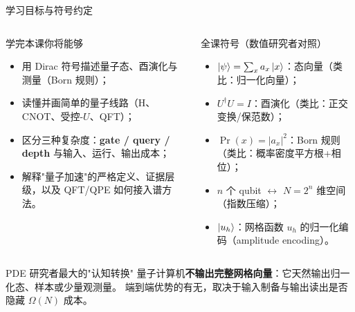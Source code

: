 \documentclass[aspectratio=169,10pt]{ctexbeamer}
\begin{document}
\begin{frame}{学习目标与符号约定}
\begin{columns}[T,totalwidth=\textwidth]
\begin{keybox}{学完本课你将能够}
\begin{itemize}
\item 用 Dirac 符号描述量子态、酉演化与测量（Born 规则）；
\item 读懂并画简单的量子线路（H、CNOT、受控-$U$、QFT）；
\item 区分三种复杂度：\textbf{gate / query / depth} 与输入、运行、输出成本；
\item 解释"量子加速"的严格定义、证据层级，以及 QFT/QPE 如何接入谱方法。
\end{itemize}
\end{keybox}
\begin{exbox}{全课符号（数值研究者对照）}
\begin{itemize}
\item $\ket{\psi}=\sum_x a_x\ket{x}$：态向量（类比：归一化向量）；
\item $U^\dagger U=I$：酉演化（类比：正交变换/保范数）；
\item $\Pr(x)=|a_x|^2$：Born 规则（类比：概率密度平方根+相位）；
\item $n$ 个 qubit $\leftrightarrow$ $N=2^n$ 维空间（指数压缩）；
\item $\ket{u_h}$：网格函数 $u_h$ 的归一化编码（amplitude encoding）。
\end{itemize}
\end{exbox}
\end{columns}
\begin{warnbox}{PDE 研究者最大的"认知转换"}
量子计算机\textbf{不输出完整网格向量}：它天然输出归一化态、样本或少量观测量。
端到端优势的有无，取决于输入制备与输出读出是否隐藏 $\Omega(N)$ 成本。
\end{warnbox}
\end{frame}
\end{document}
